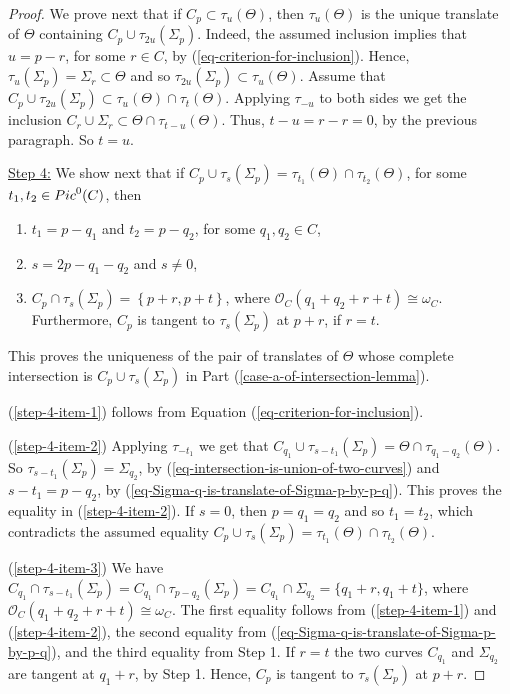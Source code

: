 \documentclass[10pt,a4paper]{amsart}
\newcommand{\Pic}{{\rm Pic}}
\newcommand{\StructureSheaf}[1]{{\mathcal O}_{#1}}
\begin{document}
\begin{proof}
We prove next that if $C_p\subset \tau_u(\Theta)$, then $\tau_u(\Theta)$ is the unique translate of $\Theta$ containing $C_p\cup \tau_{2u}(\Sigma_p)$. Indeed, the assumed inclusion implies that $u=p-r$, for some $r\in C$, by (\ref{eq-criterion-for-inclusion}). 
Hence, $\tau_u(\Sigma_p)=\Sigma_r\subset\Theta$ and so $\tau_{2u}(\Sigma_p)\subset\tau_u(\Theta)$.
Assume that 
$
C_p\cup \tau_{2u}(\Sigma_p)\subset \tau_u(\Theta)\cap\tau_t(\Theta).
$
Applying $\tau_{-u}$ to both sides we get the inclusion
$
C_r\cup\Sigma_r\subset \Theta\cap \tau_{t-u}(\Theta).
$
Thus, $t-u=r-r=0$, by the previous paragraph. So $t=u$.

\underline{Step 4:} We show next that 
if $C_p\cup\tau_s(\Sigma_p)=\tau_{t_1}(\Theta)\cap\tau_{t_2}(\Theta)$, for some $t_1, t_2\in\Pic^0(C)$, then 
\begin{enumerate}
\item
\label{step-4-item-1}
$t_1=p-q_1$ and $t_2=p-q_2$, for some $q_1, q_2\in C$, 
\item
\label{step-4-item-2}
$s=2p-q_1-q_2$ and $s\neq 0$,
\item
\label{step-4-item-3}
$C_p\cap\tau_s(\Sigma_p)=\left\{p+r, p+t
\right\}$, where $\StructureSheaf{C}(q_1+q_2+r+t)\cong\omega_C$. Furthermore, $C_p$ is tangent to $\tau_s(\Sigma_p)$ at
$p+r$, if $r=t$.
\end{enumerate}
This proves the uniqueness of the pair of translates of $\Theta$ whose complete intersection is $C_p\cup\tau_s(\Sigma_p)$ in Part (\ref{case-a-of-intersection-lemma}).

(\ref{step-4-item-1}) follows from Equation (\ref{eq-criterion-for-inclusion}).

(\ref{step-4-item-2}) 
Applying $\tau_{-t_1}$ we get that 
$C_{q_1}\cup \tau_{s-t_1}(\Sigma_p)=\Theta\cap \tau_{q_1-q_2}(\Theta)$. So $\tau_{s-t_1}(\Sigma_p)=\Sigma_{q_2}$, 
by (\ref{eq-intersection-is-union-of-two-curves}) and $s-t_1=p-q_2$, by (\ref{eq-Sigma-q-is-translate-of-Sigma-p-by-p-q}). This proves the equality in (\ref{step-4-item-2}). If $s=0$, then $p=q_1=q_2$ and so $t_1=t_2$, which contradicts the assumed equality 
$C_p\cup\tau_s(\Sigma_p)=\tau_{t_1}(\Theta)\cap\tau_{t_2}(\Theta)$.

(\ref{step-4-item-3}) We have
$C_{q_1}\cap \tau_{s-t_1}(\Sigma_p)=C_{q_1}\cap \tau_{p-q_2}(\Sigma_p)=C_{q_1}\cap \Sigma_{q_2}=\{q_1+r, q_1+t\}$, 
where $\StructureSheaf{C}(q_1+q_2+r+t)\cong\omega_C$. The first equality follows from (\ref{step-4-item-1})  and (\ref{step-4-item-2}), the second equality from (\ref{eq-Sigma-q-is-translate-of-Sigma-p-by-p-q}), and the third equality from Step 1. If $r=t$ the two curves $C_{q_1}$ and $\Sigma_{q_2}$ are tangent at $q_1+r$, by Step 1. Hence, $C_p$ is tangent to $\tau_s(\Sigma_p)$ at $p+r$.


\end{proof}
\end{document}
